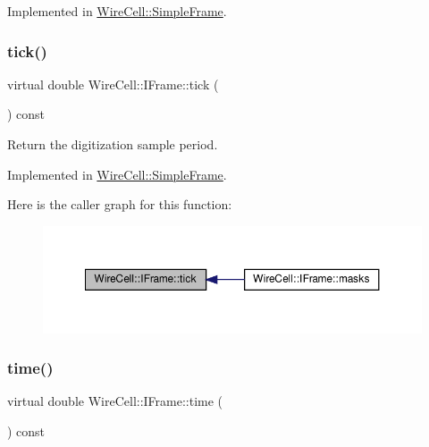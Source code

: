 Implemented in \hyperlink{class_wire_cell_1_1_simple_frame_a141502ebb9e7b55be68073b9782cb17d}{Wire\+Cell\+::\+Simple\+Frame}.

\mbox{\label{class_wire_cell_1_1_i_frame_a5003631e8cb3f013c6ab84f26e09b852}} 
\subsubsection{\texorpdfstring{tick()}{tick()}}
{\footnotesize\ttfamily virtual double Wire\+Cell\+::\+I\+Frame\+::tick (\begin{DoxyParamCaption}{ }\end{DoxyParamCaption}) const\hspace{0.3cm}{\ttfamily [pure virtual]}}



Return the digitization sample period. 



Implemented in \hyperlink{class_wire_cell_1_1_simple_frame_a14d84465625254f1b0086cef1d0bb5cd}{Wire\+Cell\+::\+Simple\+Frame}.

Here is the caller graph for this function\+:
\nopagebreak
\begin{figure}[H]
\begin{center}
\leavevmode
\includegraphics[width=350pt]{class_wire_cell_1_1_i_frame_a5003631e8cb3f013c6ab84f26e09b852_icgraph}
\end{center}
\end{figure}
\mbox{\label{class_wire_cell_1_1_i_frame_ae65ceeb2ebe5ef5371793a21a835b0df}} 
\subsubsection{\texorpdfstring{time()}{time()}}
{\footnotesize\ttfamily virtual double Wire\+Cell\+::\+I\+Frame\+::time (\begin{DoxyParamCaption}{ }\end{DoxyParamCaption}) const\hspace{0.3cm}{\ttfamily [pure virtual]}}

